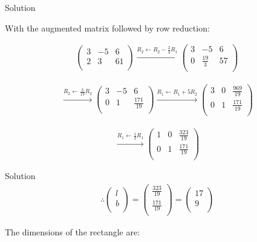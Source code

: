 \documentclass{beamer}
\begin{document}
\begin{frame}{Solution}

With the augmented matrix followed by row reduction:

\begin{align}
\left(
\begin{array}{cc|c}
3 & -5 & 6 \\
2 & 3 & 61 \\
\end{array}
\right)
\overset{R_2 \leftarrow R_2 - \frac{2}{3}R_1}{\longrightarrow}
\left(
\begin{array}{cc|c}
3 & -5 & 6 \\
0 & \frac{19}{3} & 57 \\
\end{array}
\right)
\end{align}

\begin{align}
\overset{R_2 \leftarrow \frac{3}{19}R_2}{\longrightarrow}
\left(
\begin{array}{cc|c}
3 & -5 & 6 \\
0 & 1 & \frac{171}{19} \\
\end{array}
\right)
\overset{R_1 \leftarrow R_1 + 5R_2}{\longrightarrow}
\left(
\begin{array}{cc|c}
3 & 0 & \frac{969}{19} \\
0 & 1 & \frac{171}{19} \\
\end{array}
\right)
\end{align}

\begin{align}
\overset{R_1 \leftarrow \frac{1}{3}R_1}{\longrightarrow}
\left(
\begin{array}{cc|c}
1 & 0 & \frac{323}{19} \\
0 & 1 & \frac{171}{19} \\
\end{array}
\right)
\end{align}
\end{frame}

\begin{frame}{Solution}
\begin{align}
\therefore
\begin{pmatrix}
l \\
b \\
\end{pmatrix}
=
\begin{pmatrix}
\frac{323}{19} \\
\frac{171}{19} \\
\end{pmatrix}
=
\begin{pmatrix}
17 \\
9 \\
\end{pmatrix}
\end{align}

The dimensions of the rectangle are:
\begin{center}
\end{center}

\end{frame}
\end{document}
